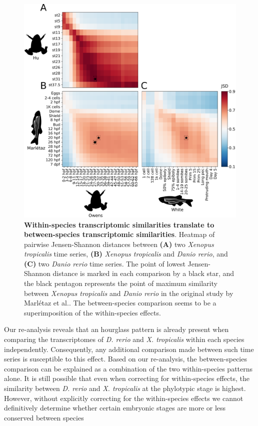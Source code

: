 \begin{figure}[H]
    \includegraphics[width=\linewidth]{ch.hourglass/images/between_experiment.png}
    \caption{\textbf{Within-species transcriptomic similarities translate to between-species transcriptomic similarities}. Heatmap of pairwise Jensen-Shannon distances between \textbf{(A)} two \textit{Xenopus tropicalis} time series, \textbf{(B)} \textit{Xenopus tropicalis} and \textit{Danio rerio}, and \textbf{(C)} two \textit{Danio rerio} time series. The point of lowest Jensen-Shannon distance is marked in each comparison by a black star, and the black pentagon represents the point of maximum similarity between \textit{Xenopus tropicalis} and \textit{Danio rerio} in the original study by Marl\'etaz et al.\cite{marletaz2018}. The between-species comparison seems to be a superimposition of the within-species effects.}
    \label{fig:betweenexperiment}
\end{figure}

Our re-analysis reveals that an hourglass pattern is already present when comparing the transcriptomes of \textit{D. rerio} and \textit{X. tropicalis} within each species independently. Consequently, any additional comparison made between such time series is susceptible to this effect. Based on our re-analysis, the between-species comparison can be explained as a combination of the two within-species patterns alone. It is still possible that even when correcting for within-species effects, the similarity between \textit{D. rerio} and \textit{X. tropicalis} at the phylotypic stage is highest. However, without explicitly correcting for the within-species effects we cannot definitively determine whether certain embryonic stages are more or less conserved between species

